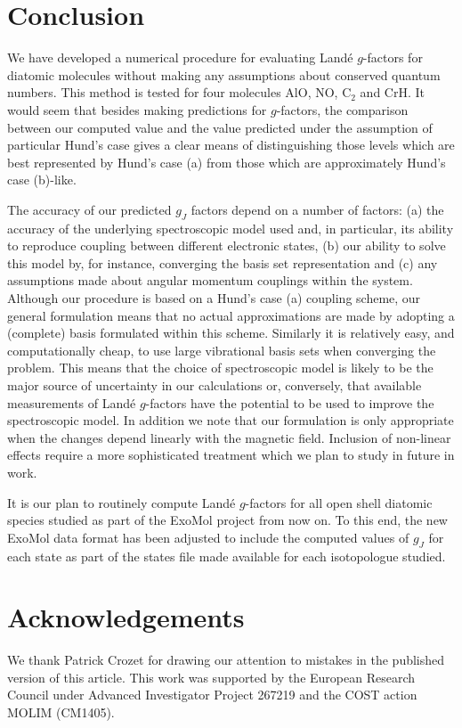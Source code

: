 \documentclass[preprint,review,12pt]{elsarticle}
\newcommand{\2}{$_{2}$}
\newcommand{\3}{$_{3}$}
\newcommand{\4}{$_{4}$}
\newcommand{\8}{$^{18}$}
\newcommand{\6}{$^{16}$}
\newcommand{\7}{$^{17}$}
\begin{document}
\section{Conclusion}

We have developed a numerical procedure for evaluating Land\'e $g$-factors
for diatomic molecules without making any assumptions about conserved
quantum numbers. This method is tested for four molecules AlO, NO, C$_2$ and
CrH. It would seem that besides making predictions for $g$-factors,
the comparison between our computed value and the value
predicted under the assumption of particular Hund's case gives a clear
means of distinguishing those levels which are best represented by
Hund's case (a) from those which are approximately Hund's case (b)-like.

The accuracy of our predicted $g_J$ factors depend on a number of factors:
(a) the accuracy of the underlying spectroscopic model used and, in particular,
its ability to reproduce coupling between different electronic states,
(b) our ability to solve this model by, for instance, converging
the basis set representation and (c) any assumptions made about
angular momentum couplings
within the system. Although our procedure is based on a Hund's case (a)
coupling scheme, our general formulation means that no actual approximations
are made by adopting a (complete) basis formulated within this scheme.
Similarly it is relatively easy, and computationally cheap, to use large
vibrational basis sets when converging the problem. This means that
the choice of spectroscopic model is likely to be the major source
of uncertainty in our calculations or, conversely, that available
measurements of Land\'e $g$-factors have the potential to be used
to improve the spectroscopic model. In addition we note that our
formulation is only appropriate when the changes depend linearly with
the magnetic field. Inclusion of non-linear effects require a more
sophisticated treatment which we plan to study in future in work.

It is our plan to routinely compute  Land\'e $g$-factors for all open
shell diatomic species studied as part of the ExoMol project from
now on. To this end, the new ExoMol data format \cite{jt631} has
been adjusted to include the computed values of $g_J$ for each state
as part of the states file made available for each isotopologue studied.


	\section*{Acknowledgements}
We thank Patrick Crozet for drawing our attention to mistakes in the published
version of this article. 	
This work was supported by the European Research Council under Advanced Investigator Project 267219 and the COST
action MOLIM (CM1405).
	
\end{document}
